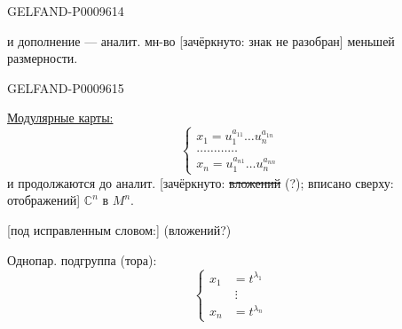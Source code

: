 \begin{GelfandAdjacentEvidence}{GELFAND-P000961}{4}


и дополнение --- аналит. мн-во [зачёркнуто: знак не разобран] меньшей размерности.
\end{GelfandAdjacentEvidence}
\begin{GelfandAdjacentEvidence}{GELFAND-P000961}{5}


\underline{Модулярные карты:}
\begin{equation*}
 \begin{cases}
 x_1=u_1^{a_{11}}\ldots u_n^{a_{1n}}\\
 \ldots\ldots\ldots\ldots\\
 x_n=u_1^{a_{n1}}\ldots u_n^{a_{nn}}
 \end{cases}\tag{1}
\end{equation*}
и продолжаются до аналит. [зачёркнуто: \sout{вложений} (?); вписано сверху: отображений] $\mathbb{C}^n$ в $M^n$.

[под исправленным словом:] (вложений?)
\end{GelfandAdjacentEvidence}


Однопар. подгруппа (тора):
\begin{equation*}
 \left\{\begin{aligned}
 x_1&=t^{\lambda_1}\\[-0.4ex]
 &\ \vdots\\
 x_n&=t^{\lambda_n}
 \end{aligned}\right.\tag{2}
\end{equation*}

